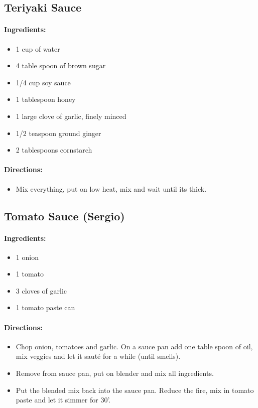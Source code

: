 \documentclass{article}
\begin{document}
\subsection{Teriyaki Sauce}

\paragraph{Ingredients:}
\begin{itemize}
    \item 1 cup of water
    \item 4 table spoon of brown sugar
    \item 1/4 cup soy sauce
    \item 1 tablespoon honey
    \item 1 large clove of garlic, finely minced
    \item 1/2 teaspoon ground ginger
    \item 2 tablespoons cornstarch
\end{itemize}

\paragraph{Directions:}
\begin{itemize}
    \item Mix everything, put on low heat, mix and wait until its thick.
\end{itemize}

\subsection{Tomato Sauce (Sergio)}

\paragraph{Ingredients:}
\begin{itemize}
    \item 1 onion
    \item 1 tomato
    \item 3 cloves of garlic
    \item 1 tomato paste can
\end{itemize}

\paragraph{Directions:}
\begin{itemize}
    \item Chop onion, tomatoes and garlic. On a sauce pan add one table spoon of oil, mix veggies and let it sauté for a while (until smells).
    \item Remove from sauce pan, put on blender and mix all ingredients.
    \item Put the blended mix back into the sauce pan. Reduce the fire, mix in tomato paste and let it simmer for 30'.
\end{itemize}
\end{document}
